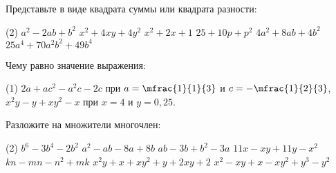 \begin{homework}[number=2]
	\begin{listofex}
		\item Представьте в виде квадрата суммы или квадрата разности:
		\begin{tasks}(2)
			\task \( a^2-2ab+b^2 \)
			\task \( x^2+4xy+4y^2 \)
			\task \( x^2+2x+1 \)
			\task \( 25+10p+p^2 \)
			\task \( 4a^2+8ab+4b^2 \)
			\task \( 25a^4+70a^2b^2+49b^4 \)
		\end{tasks}
		\item Чему равно значение выражения:
		\begin{tasks}(1)
			\task \( 2a+ac^2-a^2c-2c \) при \( a=\mfrac{1}{1}{3} \) и \( c=-\mfrac{1}{2}{3}  \),
			\task \( x^2y-y+xy^2-x \) при \( x=4 \) и \( y=0,25 \).
		\end{tasks}
		\item Разложите на множители многочлен:
		\begin{tasks}(2)
			\task \( b^6-3b^4-2b^2 \)
			\task \( a^2-ab-8a+8b \)
			\task \( ab-3b+b^2-3a \)
			\task \( 11x-xy+11y-x^2 \)
			\task \( kn-mn-n^2+mk \)
			\task \( x^2y+x+xy^2+y+2xy+2 \)
			\task \( x^2-xy+x-xy^2+y^3-y^2 \)
		\end{tasks}
		
		
	\end{listofex}
\end{homework}


